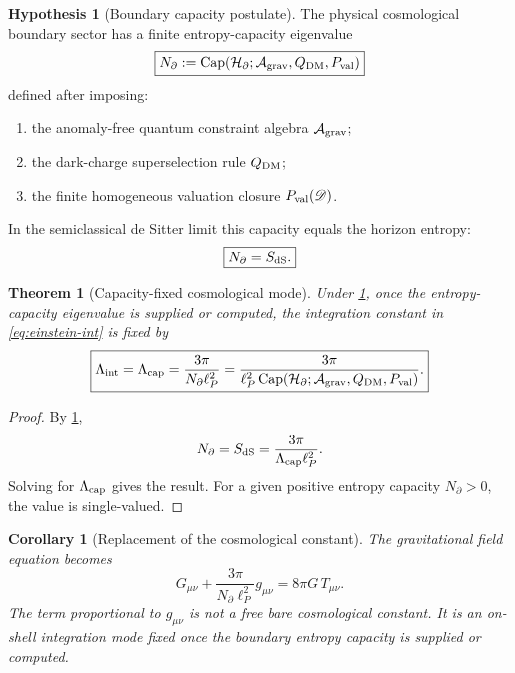 \documentclass[aps,prd,reprint,nofootinbib,superscriptaddress,floatfix]{revtex4-2}
\numberwithin{equation}{section}
\theoremstyle{definition}
\newtheorem{hypothesis}{Hypothesis}[section]
\theoremstyle{plain}
\newtheorem{theorem}{Theorem}[section]
\newtheorem{corollary}{Corollary}[section]
\newcommand{\Dil}{\mathscr D}
\newcommand{\Agrav}{\mathcal A_{\rm grav}}
\newcommand{\Ncap}{N_{\partial}}
\newcommand{\Capacity}{\operatorname{Cap}}
\begin{document}
\begin{hypothesis}[Boundary capacity postulate]\label{hyp:capacity}
The physical cosmological boundary sector has a finite entropy-capacity eigenvalue
\begin{equation}
\boxed{
\Ncap
:=
\Capacity(\mathcal H_\partial;\Agrav,Q_{\rm DM},P_{\rm val})
}
\end{equation}
defined after imposing:
\begin{enumerate}
\item the anomaly-free quantum constraint algebra \(\Agrav\);
\item the dark-charge superselection rule \(Q_{\rm DM}\);
\item the finite homogeneous valuation closure \(P_{\rm val}(\Dil)\).
\end{enumerate}
In the semiclassical de Sitter limit this capacity equals the horizon entropy:
\begin{equation}
\boxed{
\Ncap=S_{\rm dS}.
}
\end{equation}
\end{hypothesis}

\begin{theorem}[Capacity-fixed cosmological mode]\label{thm:capacity-mode}
Under \cref{hyp:capacity}, once the entropy-capacity eigenvalue is supplied or computed, the integration constant in \eqref{eq:einstein-int} is fixed by
\begin{equation}
\boxed{
\Lambda_{\rm int}=\Lambda_{\rm cap}
=
\frac{3\pi}{\Ncap\ell_P^2}
=
\frac{3\pi}
{\ell_P^2\Capacity(\mathcal H_\partial;\Agrav,Q_{\rm DM},P_{\rm val})}.
}
\end{equation}
\end{theorem}

\begin{proof}
By \cref{hyp:capacity},
\[
\Ncap=S_{\rm dS}=\frac{3\pi}{\Lambda_{\rm cap}\ell_P^2}.
\]
Solving for \(\Lambda_{\rm cap}\) gives the result.  For a given positive entropy capacity \(\Ncap>0\), the value is single-valued.
\end{proof}

\begin{corollary}[Replacement of the cosmological constant]\label{cor:lambda-replacement}
The gravitational field equation becomes
\begin{equation}
\boxed{
G_{\mu\nu}
+
\frac{3\pi}{\Ncap\ell_P^2}g_{\mu\nu}
=
8\pi G\,T_{\mu\nu}.
}
\label{eq:capacity-einstein}
\end{equation}
The term proportional to \(g_{\mu\nu}\) is not a free bare cosmological constant.  It is an on-shell integration mode fixed once the boundary entropy capacity is supplied or computed.
\end{corollary}
\end{document}
